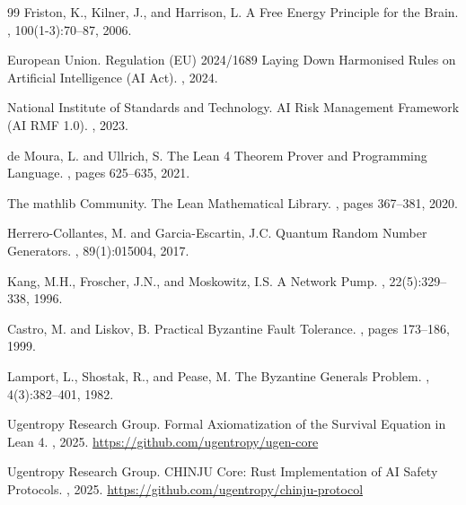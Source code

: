 \documentclass[11pt,a4paper]{article}
\begin{document}
\begin{thebibliography}{99}
Friston, K., Kilner, J., and Harrison, L.
\newblock A Free Energy Principle for the Brain.
, 100(1-3):70--87, 2006.

European Union.
\newblock Regulation (EU) 2024/1689 Laying Down Harmonised Rules on Artificial Intelligence (AI Act).
, 2024.

National Institute of Standards and Technology.
\newblock AI Risk Management Framework (AI RMF 1.0).
, 2023.

de Moura, L. and Ullrich, S.
\newblock The Lean 4 Theorem Prover and Programming Language.
, pages 625--635, 2021.

The mathlib Community.
\newblock The Lean Mathematical Library.
, pages 367--381, 2020.

Herrero-Collantes, M. and Garcia-Escartin, J.C.
\newblock Quantum Random Number Generators.
, 89(1):015004, 2017.

Kang, M.H., Froscher, J.N., and Moskowitz, I.S.
\newblock A Network Pump.
, 22(5):329--338, 1996.

Castro, M. and Liskov, B.
\newblock Practical Byzantine Fault Tolerance.
, pages 173--186, 1999.

Lamport, L., Shostak, R., and Pease, M.
\newblock The Byzantine Generals Problem.
, 4(3):382--401, 1982.

Ugentropy Research Group.
\newblock Formal Axiomatization of the Survival Equation in Lean 4.
, 2025.
\newblock \url{https://github.com/ugentropy/ugen-core}

Ugentropy Research Group.
\newblock CHINJU Core: Rust Implementation of AI Safety Protocols.
, 2025.
\newblock \url{https://github.com/ugentropy/chinju-protocol}

\end{thebibliography}
\end{document}
